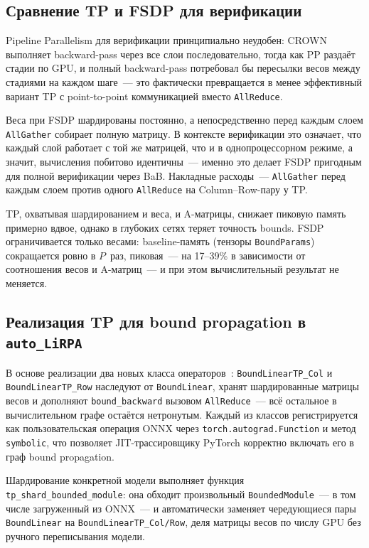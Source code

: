 \subsection{Сравнение TP и FSDP для верификации}

Pipeline Parallelism для верификации принципиально неудобен: CROWN
выполняет backward-pass через все слои последовательно, тогда как PP
раздаёт стадии по GPU, и полный backward-pass потребовал бы пересылки
весов между стадиями на каждом шаге~--- это фактически превращается
в менее эффективный вариант TP с point-to-point коммуникацией
вместо \texttt{AllReduce}.

Веса при FSDP шардированы постоянно, а непосредственно перед каждым
слоем \texttt{AllGather} собирает полную матрицу. В контексте
верификации это означает, что каждый слой работает с той же матрицей,
что и в однопроцессорном режиме, а значит, вычисления побитово
идентичны~--- именно это делает FSDP пригодным для полной верификации
через BaB. Накладные расходы~--- \texttt{AllGather} перед каждым слоем
против одного \texttt{AllReduce} на Column--Row-пару у TP.

TP, охватывая шардированием и веса, и A-матрицы, снижает пиковую
память примерно вдвое, однако в глубоких сетях теряет точность bounds.
FSDP ограничивается только весами: baseline-память
(тензоры \texttt{BoundParams}) сокращается ровно в $P$~раз,
пиковая~--- на 17--39\% в зависимости от соотношения весов
и A-матриц~--- и при этом вычислительный результат не меняется.

\subsection{Реализация TP для bound propagation в \texttt{auto\_LiRPA}}

В основе реализации два новых класса операторов~\cite{AutoLiRPARepo}:
\texttt{BoundLinearTP\_Col} и \texttt{BoundLinearTP\_Row} наследуют от
\texttt{BoundLinear}, хранят шардированные матрицы весов и дополняют
\texttt{bound\_backward} вызовом \texttt{AllReduce}~--- всё остальное
в вычислительном графе остаётся нетронутым.
Каждый из классов регистрируется как пользовательская операция ONNX
через \texttt{torch.autograd.Function} и метод \texttt{symbolic},
что позволяет JIT-трассировщику PyTorch корректно включать его
в граф bound propagation.

\begin{sloppypar}
Шардирование конкретной модели выполняет функция
\texttt{tp\_shard\_bounded\_module}: она обходит произвольный
\texttt{BoundedModule}~--- в том числе загруженный из ONNX~---
и автоматически заменяет чередующиеся пары \texttt{BoundLinear}
на \texttt{BoundLinearTP\_Col/Row}, деля матрицы весов по числу GPU
без ручного переписывания модели.
\end{sloppypar}

